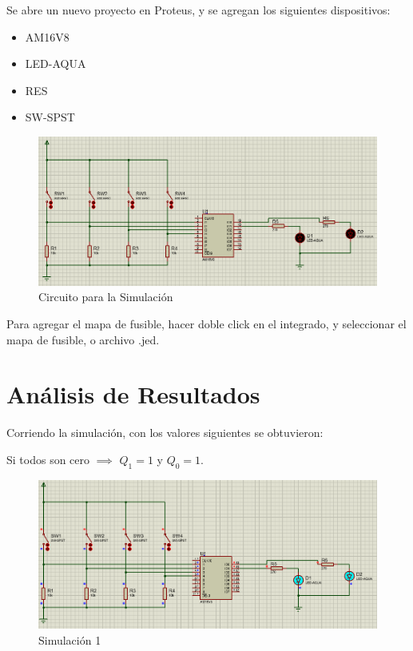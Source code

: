 \documentclass{article}
\begin{document}
    Se abre un nuevo proyecto en Proteus, y se agregan los siguientes dispositivos:

    \begin{itemize}
        \item AM16V8
        \item LED-AQUA
        \item RES
        \item SW-SPST
    \end{itemize}


    \begin{figure}[H]
        \centering
        \includegraphics[width=0.5\paperwidth]{images/proteus-sim-circuit}
        \caption{Circuito para la Simulación}
    \end{figure}

    Para agregar el mapa de fusible, hacer doble click en el integrado, y seleccionar el mapa de fusible, o archivo .jed.

    \section{Análisis de Resultados}\label{sec:análisis-de-resultados}

    Corriendo la simulación, con los valores siguientes se obtuvieron:

    \bigbreak

    Si todos son cero $\implies$ $Q_1 = 1$ y $Q_0 = 1$.



    \begin{figure}[H]
        \centering
        \includegraphics[width=0.5\paperwidth]{images/proteus-sim-1}
        \caption{Simulación 1}
    \end{figure}
\end{document}
